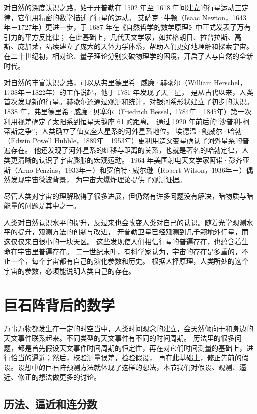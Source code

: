 \documentclass[a4paper,10.5pt]{book}
\begin{document}
对自然的深度认识之路，始于开普勒在 1602 年至 1618 年间建立的行星运动三定律，它们用精密的数学描述了行星的运动。
艾萨克·牛顿（Isaac Newton，1643年－1727年）更进一步，于 1687 年在《自然哲学的数学原理》中正式发表了万有引力的平方反比律；
在此基础上，几代天文学家，如拉格朗日、拉普拉斯、高斯、庞加莱，陆续建立了庞大的天体力学体系，帮助人们更好地理解和探索宇宙。
在二十世纪初，相对论、量子理论分别突破物理学的困境，开启了人与自然的全新时代。

对自然的丰富认识之路，可以从弗里德里希·威廉·赫歇尔（William Herschel，1738年－1822年）的工作说起，他于 1781 年发现了天王星，
是从古代以来，人类首次发现新的行星。赫歇尔还通过观测和统计，对银河系形状建立了初步的认识。
1838 年，弗里德里希·威廉·贝塞尔（Friedrich Bessel，1784年－1846年）第一次利用视差确定了太阳系到恒星天鹅座 61 的距离。
通过 1920 年前后的“沙普利-柯蒂斯之争”，人类确立了仙女座大星系的河外星系地位。
埃德温·鲍威尔·哈勃（Edwin Powell Hubble，1889年－1953年）更利用造父变星确认了河外星系的普遍存在。
他还发现了河外星系的红移与距离的关系，也就是著名的哈勃定律，人类更清晰的认识了宇宙膨胀的宏观运动。
1964 年美国射电天文学家阿诺·彭齐亚斯（Arno Penzias，1933年－）和罗伯特·威尔逊（Robert Wilson，1936年－）偶然发现宇宙微波背景，
为宇宙大爆炸理论提供了观测证据。

尽管人类对宇宙的理解取得了很多进展，但仍然有许多问题没有解决，暗物质与暗能量的问题是其中之一。

人类对自然认识水平的提升，反过来也会改变人类对自己的认识。随着光学观测水平的提升，观测方法的创新与改进，
开普勒卫星已经观测到几千颗地外行星，而这仅仅来自很小的一块天区。
这些发现使人们相信行星的普遍存在，也蕴含着生命在宇宙里普遍存在。
二十世纪末叶，有科学家认为，宇宙的存在是多重的，不止一个，每个宇宙都有自己的演化参数和历史。
根据人择原理，人类所处的这个宇宙的参数，必须能说明人类自己的存在。


\section{巨石阵背后的数学}

万事万物都发生在一定的时空当中，人类时间观念的建立，会天然倾向于和身边的天文事件联系起来。不同类型的天文事件有不同的时间周期。
历法里的很多问题，都是首先假设天文事件时间周期的恒定性，再在对它们时间测量的基础上，进行恰当的逼近；然后，校验测量误差，检验假设，
再在此基础上，修正先前的假设。设想中的巨石阵预测方法就体现了这样的想法，本节我们对假设、观测、逼近、修正的想法做更多的讨论。

\subsection{历法、逼近和连分数}
\end{document}
